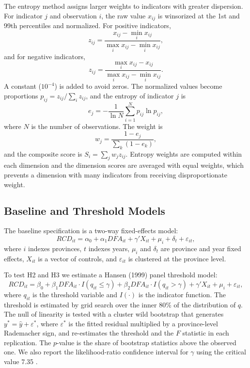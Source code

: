 The entropy method assigns larger weights to indicators with greater dispersion. For indicator $j$ and observation $i$, the raw value $x_{ij}$ is winsorized at the 1st and 99th percentiles and normalized. For positive indicators,
\begin{equation}
z_{ij}=\frac{x_{ij}-\min_i x_{ij}}{\max_i x_{ij}-\min_i x_{ij}},
\end{equation}
and for negative indicators,
\begin{equation}
z_{ij}=\frac{\max_i x_{ij}-x_{ij}}{\max_i x_{ij}-\min_i x_{ij}}.
\end{equation}
A constant ($10^{-4}$) is added to avoid zeros. The normalized values become proportions $p_{ij}=z_{ij}/\sum_i z_{ij}$, and the entropy of indicator $j$ is
\begin{equation}
e_j=-\frac{1}{\ln N}\sum_{i=1}^{N}p_{ij}\ln p_{ij},
\end{equation}
where $N$ is the number of observations. The weight is
\begin{equation}
w_j=\frac{1-e_j}{\sum_{k}(1-e_k)},
\end{equation}
and the composite score is $S_i=\sum_j w_j z_{ij}$. Entropy weights are computed within each dimension and the dimension scores are averaged with equal weights, which prevents a dimension with many indicators from receiving disproportionate weight.

\subsection{Baseline and Threshold Models}

The baseline specification is a two-way fixed-effects model:
\begin{equation}
RCD_{it}=\alpha_0+\alpha_1 DFA_{it}+\gamma'X_{it}+\mu_i+\delta_t+\varepsilon_{it},
\label{eq:baseline}
\end{equation}
where $i$ indexes provinces, $t$ indexes years, $\mu_i$ and $\delta_t$ are province and year fixed effects, $X_{it}$ is a vector of controls, and $\varepsilon_{it}$ is clustered at the province level.

To test H2 and H3 we estimate a Hansen (1999) panel threshold model:
\begin{equation}
RCD_{it}=\beta_0+\beta_1 DFA_{it}\cdot I(q_{it}\leq\gamma)
+\beta_2 DFA_{it}\cdot I(q_{it}>\gamma)
+\gamma'X_{it}+\mu_i+\varepsilon_{it},
\label{eq:threshold}
\end{equation}
where $q_{it}$ is the threshold variable and $I(\cdot)$ is the indicator function. The threshold is estimated by grid search over the inner 80\% of the distribution of $q$. The null of linearity is tested with a cluster wild bootstrap that generates $y^*=\hat{y}+\varepsilon^*$, where $\varepsilon^*$ is the fitted residual multiplied by a province-level Rademacher sign, and re-estimates the threshold and the $F$ statistic in each replication. The $p$-value is the share of bootstrap statistics above the observed one. We also report the likelihood-ratio confidence interval for $\gamma$ using the critical value 7.35 \citep{hansen1999,hansen2000}.

